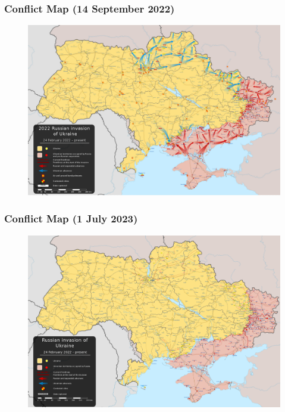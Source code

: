 \documentclass[handout]{beamer}
\begin{document}
\begin{frame} 
	\frametitle{\LARGE{Conflict Map (14 September 2022)}}
	\begin{figure}[ht!]
		\centering
		\includegraphics[width=\textwidth,height=\textheight, keepaspectratio]{14sept2022ukraine.png}
	\end{figure}
\end{frame}

\begin{frame} 
	\frametitle{\LARGE{Conflict Map (1 July 2023)}}
	\begin{figure}[ht!]
		\centering
		\includegraphics[width=\textwidth,height=\textheight, keepaspectratio]{1july2023ukraine.png}
	\end{figure}
\end{frame}
\end{document}

